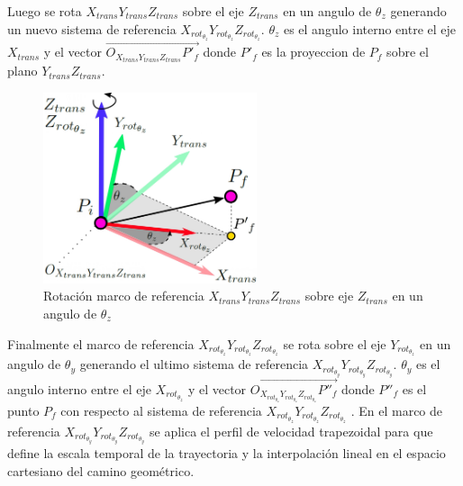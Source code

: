         Luego se rota $X_{trans}Y_{trans}Z_{trans}$ sobre el eje $Z_{trans}$ en un angulo de $\theta_z$ generando un nuevo sistema de referencia $X_{rot_{\theta_z}}Y_{rot_{\theta_z}}Z_{rot_{\theta_z}}$. $\theta_z$  es el angulo interno entre el eje $X_{trans}$ y el vector   $\overrightarrow{O_{X_{trans}Y_{trans}Z_{trans}}{P'}_f}$ donde ${P'}_f$ es la  proyeccion de $P_f$ sobre el plano  $Y_{trans}Z_{trans}$.

        \begin{figure}[htb]
                \centering
                \includegraphics[width=0.56\textwidth]{Main/Chapter6/Images6/DIBUJO532.jpg}
                \caption{Rotación marco de referencia $X_{trans}Y_{trans}Z_{trans}$ sobre eje $Z_{trans}$ en un angulo de $\theta_z$  }
        \end{figure}
    \newpage
        Finalmente el marco de referencia $X_{rot_{\theta_z}}Y_{rot_{\theta_z}}Z_{rot_{\theta_z}}$ se rota sobre el eje  $Y_{rot_{\theta_z}}$ en un angulo de $\theta_y$ generando el ultimo sistema de referencia $X_{rot_{\theta_y}}Y_{rot_{\theta_y}}Z_{rot_{\theta_y}}$.
        $\theta_y$  es el angulo interno entre el eje $X_{rot_{\theta_z}}$ y el vector   $\overrightarrow{O_{X_{rot_{\theta_z}}Y_{rot_{\theta_z}}Z_{rot_{\theta_z}}}{P''}_f}$ donde ${P''}_f$ es el punto  ${P}_f$ con respecto al sistema de referencia  $X_{rot_{\theta_z}}Y_{rot_{\theta_z}}Z_{rot_{\theta_z}}$ .
         En el marco de referencia $X_{rot_{\theta_y}}Y_{rot_{\theta_y}}Z_{rot_{\theta_y}}$ se aplica el perfil de velocidad trapezoidal para que define la escala temporal de la trayectoria y la interpolación lineal en el espacio cartesiano del camino geométrico.
         

